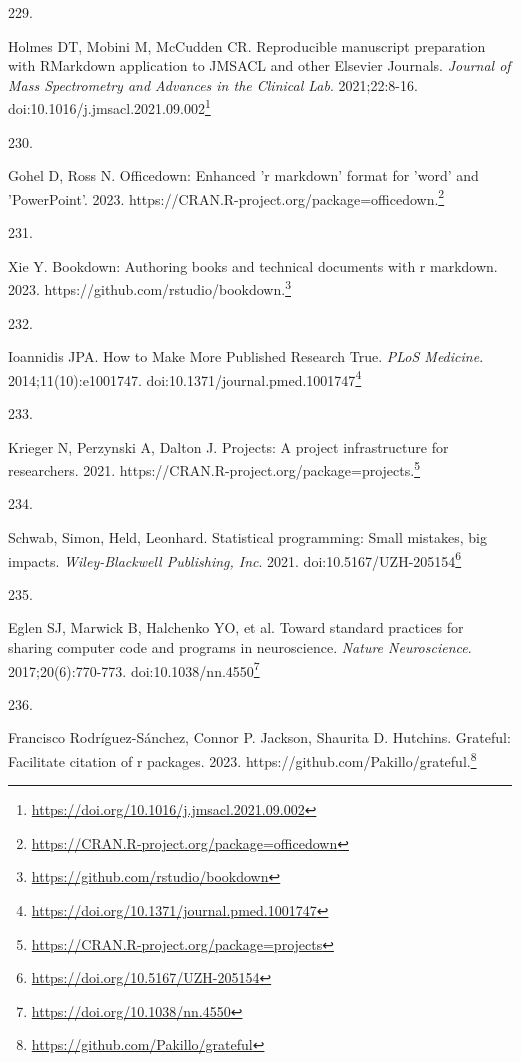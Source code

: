 \documentclass[
  a4paper,
]{book}
\newlength{\cslhangindent}
\newlength{\csllabelwidth}
\newlength{\cslentryspacingunit} %
\newenvironment{CSLReferences}[2] %
 {%
  \setlength{\parindent}{0pt}
  \ifodd #1
  \let\oldpar\par
  \def\par{\hangindent=\cslhangindent\oldpar}
  \fi
  \setlength{\parskip}{#2\cslentryspacingunit}
 }%
 {}
\newcommand{\CSLLeftMargin}[1]{\parbox[t]{\csllabelwidth}{#1}}
\newcommand{\CSLRightInline}[1]{\parbox[t]{\linewidth - \csllabelwidth}{#1}\break}
\renewcommand{\href}[2]{#2\footnote{\url{#1}}}
\begin{document}
\begin{CSLReferences}{0}{0}
\leavevmode{}%
\CSLLeftMargin{229. }%
\CSLRightInline{Holmes DT, Mobini M, McCudden CR. Reproducible manuscript preparation with RMarkdown application to JMSACL and other Elsevier Journals. \emph{Journal of Mass Spectrometry and Advances in the Clinical Lab}. 2021;22:8-16. doi:\href{https://doi.org/10.1016/j.jmsacl.2021.09.002}{10.1016/j.jmsacl.2021.09.002}}

\leavevmode{}%
\CSLLeftMargin{230. }%
\CSLRightInline{Gohel D, Ross N. Officedown: Enhanced 'r markdown' format for 'word' and 'PowerPoint'. 2023. \href{https://CRAN.R-project.org/package=officedown}{https://CRAN.R-project.org/package=officedown.}}

\leavevmode{}%
\CSLLeftMargin{231. }%
\CSLRightInline{Xie Y. Bookdown: Authoring books and technical documents with r markdown. 2023. \href{https://github.com/rstudio/bookdown}{https://github.com/rstudio/bookdown.}}

\leavevmode{}%
\CSLLeftMargin{232. }%
\CSLRightInline{Ioannidis JPA. How to Make More Published Research True. \emph{PLoS Medicine}. 2014;11(10):e1001747. doi:\href{https://doi.org/10.1371/journal.pmed.1001747}{10.1371/journal.pmed.1001747}}

\leavevmode{}%
\CSLLeftMargin{233. }%
\CSLRightInline{Krieger N, Perzynski A, Dalton J. Projects: A project infrastructure for researchers. 2021. \href{https://CRAN.R-project.org/package=projects}{https://CRAN.R-project.org/package=projects.}}

\leavevmode{}%
\CSLLeftMargin{234. }%
\CSLRightInline{Schwab, Simon, Held, Leonhard. Statistical programming: Small mistakes, big impacts. \emph{Wiley-Blackwell Publishing, Inc}. 2021. doi:\href{https://doi.org/10.5167/UZH-205154}{10.5167/UZH-205154}}

\leavevmode{}%
\CSLLeftMargin{235. }%
\CSLRightInline{Eglen SJ, Marwick B, Halchenko YO, et al. Toward standard practices for sharing computer code and programs in neuroscience. \emph{Nature Neuroscience}. 2017;20(6):770-773. doi:\href{https://doi.org/10.1038/nn.4550}{10.1038/nn.4550}}

\leavevmode{}%
\CSLLeftMargin{236. }%
\CSLRightInline{Francisco Rodríguez-Sánchez, Connor P. Jackson, Shaurita D. Hutchins. Grateful: Facilitate citation of r packages. 2023. \href{https://github.com/Pakillo/grateful}{https://github.com/Pakillo/grateful.}}


\end{CSLReferences}
\end{document}
